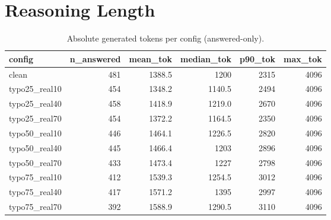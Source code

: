 \documentclass[11pt]{article}
\begin{document}
\section*{Reasoning Length}
\begin{table}[H]
\centering
\caption{Absolute generated tokens per config (answered-only).}
\small
\begin{adjustbox}{max width=\textwidth}
\begin{tabular}{lrrrrr}
\toprule
\textbf{config} & \textbf{n\_answered} & \textbf{mean\_tok} & \textbf{median\_tok} & \textbf{p90\_tok} & \textbf{max\_tok} \\
\midrule
clean & 481 & 1388.5 & 1200 & 2315 & 4096 \\
typo25\_real10 & 454 & 1348.2 & 1140.5 & 2494 & 4096 \\
typo25\_real40 & 458 & 1418.9 & 1219.0 & 2670 & 4096 \\
typo25\_real70 & 454 & 1372.2 & 1164.5 & 2350 & 4096 \\
typo50\_real10 & 446 & 1464.1 & 1226.5 & 2820 & 4096 \\
typo50\_real40 & 445 & 1466.4 & 1203 & 2896 & 4096 \\
typo50\_real70 & 433 & 1473.4 & 1227 & 2798 & 4096 \\
typo75\_real10 & 412 & 1539.3 & 1254.5 & 3012 & 4096 \\
typo75\_real40 & 417 & 1571.2 & 1395 & 2997 & 4096 \\
typo75\_real70 & 392 & 1588.9 & 1290.5 & 3110 & 4096 \\
\bottomrule
\end{tabular}
\end{adjustbox}
\end{table}
\end{document}
